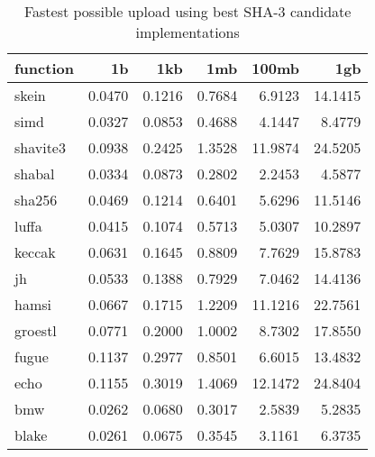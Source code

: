 \begin{table} 
  \centering 
    \begin{tabular}{ | l | r | r | r | r | r | }
      \hline
      \textbf{function} & \textbf{1b} & \textbf{1kb} & \textbf{1mb} & \textbf{100mb} & \textbf{1gb} \\ \hline
      skein & 0.0470 & 0.1216 & 0.7684 & 6.9123 & 14.1415 \\ \hline
      simd & 0.0327 & 0.0853 & 0.4688 & 4.1447 & 8.4779 \\ \hline
      shavite3 & 0.0938 & 0.2425 & 1.3528 & 11.9874 & 24.5205 \\ \hline
      shabal & 0.0334 & 0.0873 & 0.2802 & 2.2453 & 4.5877 \\ \hline
      sha256 & 0.0469 & 0.1214 & 0.6401 & 5.6296 & 11.5146 \\ \hline
      luffa & 0.0415 & 0.1074 & 0.5713 & 5.0307 & 10.2897 \\ \hline
      keccak & 0.0631 & 0.1645 & 0.8809 & 7.7629 & 15.8783 \\ \hline
      jh & 0.0533 & 0.1388 & 0.7929 & 7.0462 & 14.4136 \\ \hline
      hamsi & 0.0667 & 0.1715 & 1.2209 & 11.1216 & 22.7561 \\ \hline
      groestl & 0.0771 & 0.2000 & 1.0002 & 8.7302 & 17.8550 \\ \hline
      fugue & 0.1137 & 0.2977 & 0.8501 & 6.6015 & 13.4832 \\ \hline
      echo & 0.1155 & 0.3019 & 1.4069 & 12.1472 & 24.8404 \\ \hline
      bmw & 0.0262 & 0.0680 & 0.3017 & 2.5839 & 5.2835 \\ \hline
      blake & 0.0261 & 0.0675 & 0.3545 & 3.1161 & 6.3735 \\ \hline
      \end{tabular} 
      \caption{Fastest possible upload using best SHA-3 candidate implementations}
      \label{tbl:tahoe:optimized_g}
\end{table}

